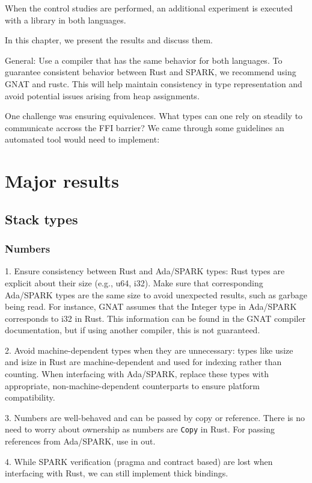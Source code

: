 \documentclass[nomenclature, english, bibtex]{kththesis}
\begin{document}
When the control studies are performed, an additional experiment is executed with a library in both languages.



In this chapter, we present the results and discuss them.


General:
Use a compiler that has the same behavior for both languages. To guarantee consistent behavior between Rust and SPARK, we recommend using GNAT and rustc. This will help maintain consistency in type representation and avoid potential issues arising from heap assignments.

One challenge was ensuring equivalences. What types can one rely on steadily to communicate accross the FFI barrier?
We came through some guidelines an automated tool would need to implement:

\section{Major results}

\subsection{Stack types}
\subsubsection{Numbers}
1. Ensure consistency between Rust and Ada/SPARK types: Rust types are explicit about their size (e.g., u64, i32). Make sure that corresponding Ada/SPARK types are the same size to avoid unexpected results, such as garbage being read. For instance, GNAT assumes that the Integer type in Ada/SPARK corresponds to i32 in Rust. This information can be found in the GNAT compiler documentation, but if using another compiler, this is not guaranteed.

2. Avoid machine-dependent types when they are unnecessary: types like usize and isize in Rust are machine-dependent and used for indexing rather than counting. When interfacing with Ada/SPARK, replace these types with appropriate, non-machine-dependent counterparts to ensure platform compatibility.

3. Numbers are well-behaved and can be passed by copy or reference. There is no need to worry about ownership as numbers are \texttt{Copy} in Rust. For passing references from Ada/SPARK, use in out.

4. While SPARK verification (pragma and contract based) are lost when interfacing with Rust, we can still implement thick bindings.
\end{document}
